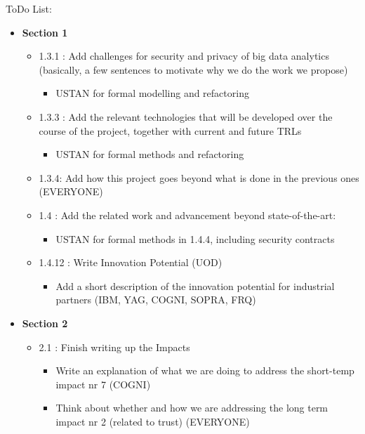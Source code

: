 \documentclass[a4paper,11pt]{article}
\begin{document}
\pagebreak

ToDo List:

\begin{itemize}

\item \textbf{Section 1}
\begin{itemize} 
\item 1.3.1 : Add challenges for security and privacy of big data analytics (basically, a few sentences to motivate why we do the work we propose)
\begin{itemize}
\item USTAN for formal modelling and refactoring
\end{itemize}

\item 1.3.3 : Add the relevant technologies that will be developed over the course of the project, together with current and future TRLs
\begin{itemize}
\item USTAN for formal methods and refactoring
\end{itemize}

\item 1.3.4: Add how this project goes beyond what is done in the previous ones (EVERYONE)

\item 1.4 : Add the related work and advancement beyond state-of-the-art:
\begin{itemize}
\item USTAN for formal methods in 1.4.4, including security contracts
\end{itemize}

	
\item 1.4.12 : Write Innovation Potential (UOD)
\begin{itemize}
\item Add a short description of the innovation potential for industrial partners (IBM, YAG, COGNI, SOPRA, FRQ)
\end{itemize}
\end{itemize}

\item \textbf{Section 2}
\begin{itemize}
\item 2.1 : Finish writing up the Impacts 
\begin{itemize}
\item Write an explanation of what we are doing to address the short-temp impact nr 7 (COGNI)
\item Think about whether and how we are addressing the long term impact nr 2 (related to trust) (EVERYONE)
\end{itemize}


\end{itemize}
\end{itemize}
\end{document}
